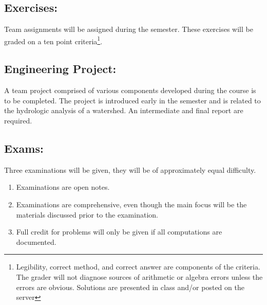 \documentclass[12pt]{article}
\begin{document}
\subsection*{Exercises:} 
Team assignments will be assigned during the semester.  
These exercises will be graded on a ten point criteria\footnote{Legibility, correct method, and correct answer are components of the criteria.   
The grader will not diagnose sources of arithmetic or algebra errors unless the errors are obvious.  
Solutions are presented in class and/or posted on the server}.

\subsection*{Engineering Project:}  
A team project comprised of various components developed during the course is to be completed.  
The project is introduced early in the semester and is related to the hydrologic analysis of a watershed.   
An intermediate and final report are required.

\subsection*{Exams:} Three examinations will be given, they will be of approximately equal difficulty.
\begin{enumerate}
\item Examinations are open notes.
\item Examinations are comprehensive, even though the main focus will be the materials discussed prior to the examination.
\item Full credit for problems will only be given if all computations are documented.
\end{enumerate}
\end{document}
